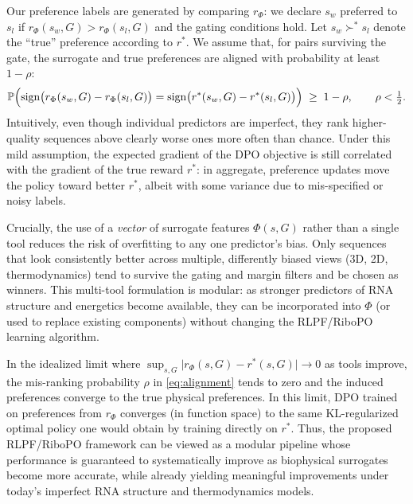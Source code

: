 {{Our preference labels are generated by comparing $r_\Phi$:
we declare $s_w$ preferred to $s_l$ if $r_\Phi(s_w,G) > r_\Phi(s_l,G)$ and
the gating conditions hold. Let $s_w \succ^* s_l$ denote the ``true''
preference according to $r^*$. We assume that, for pairs surviving the gate,
the surrogate and true preferences are aligned with probability at least
$1-\rho$:
\begin{equation}
    \mathbb{P}\Bigl(
        \operatorname{sign}\bigl(r_\Phi(s_w, G) - r_\Phi(s_l, G)\bigr)
        =
        \operatorname{sign}\bigl(r^*(s_w, G) - r^*(s_l, G)\bigr)
    \Bigr)
    \;\geq\; 1 - \rho,
    \qquad \rho < \tfrac{1}{2}.
    \label{eq:alignment}
\end{equation}
Intuitively, even though individual predictors are imperfect, they rank
higher-quality sequences above clearly worse ones more often than chance.
Under this mild assumption, the expected gradient of the DPO objective is
still correlated with the gradient of the true reward $r^*$: in aggregate,
preference updates move the policy toward better $r^*$, albeit with some
variance due to mis-specified or noisy labels.

Crucially, the use of a \emph{vector} of surrogate features
$\Phi(s,G)$ rather than a single tool reduces the risk of overfitting to any
one predictor's bias. Only sequences that look consistently better across
multiple, differently biased views (3D, 2D, thermodynamics) tend to survive
the gating and margin filters and be chosen as winners. This multi-tool
formulation is modular: as stronger predictors of RNA structure and
energetics become available, they can be incorporated into $\Phi$ (or used
to replace existing components) without changing the RLPF/RiboPO learning
algorithm.

In the idealized limit where
$\sup_{s,G} \lvert r_\Phi(s,G) - r^*(s,G) \rvert \to 0$ as tools improve,
the mis-ranking probability $\rho$ in \eqref{eq:alignment} tends to zero and
the induced preferences converge to the true physical preferences. In this
limit, DPO trained on preferences from $r_\Phi$ converges (in function space)
to the same KL-regularized optimal policy one would obtain by training
directly on $r^*$. Thus, the proposed RLPF/RiboPO framework can be viewed as
a modular pipeline whose performance is guaranteed to systematically improve
as biophysical surrogates become more accurate, while already yielding
meaningful improvements under today's imperfect RNA structure and
thermodynamics models.




















}}
